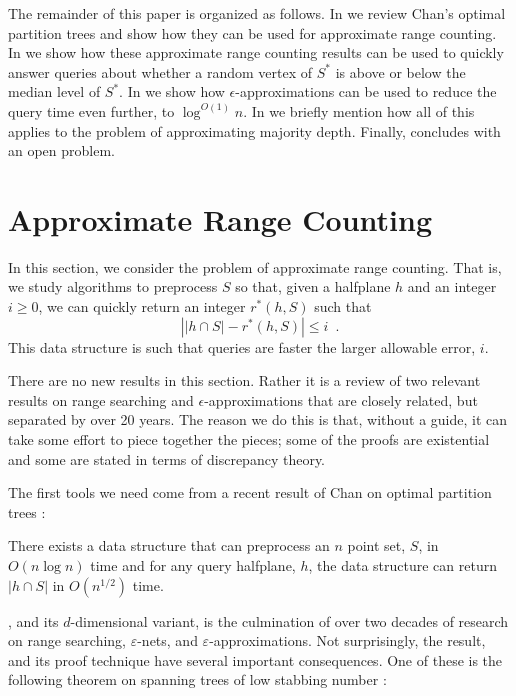 \documentclass{patmorin}
\newcommand{\eps}{\varepsilon}
\begin{document}
The remainder of this paper is organized as follows.  In
 we review Chan's optimal partition trees
and show how they can be used for approximate range counting.
In  we show how these approximate range
counting results can be used to quickly answer queries about whether
a random vertex of $S^*$ is above or below the median level of $S^*$.
In  we show how $\epsilon$-approximations can
be used to reduce the query time even further, to $\log^{O(1)} n$.
In  we briefly mention how all of this applies to
the problem of approximating majority depth.  Finally, 
concludes with an open problem.

\section{Approximate Range Counting}

In this section, we consider the problem of approximate range counting.
That is, we study algorithms to preprocess $S$ so that, given a halfplane
$h$ and an integer $i\ge 0$, we can quickly return an integer $r^*(h,S)$
such that
\[
   \left| |h\cap S| - r^*(h,S)\right| \le i \enspace .
\]
This data structure is such that queries are faster the larger allowable
error, $i$.

There are no new results in this section. Rather it is a review of two
relevant results on range searching and $\epsilon$-approximations that are
closely related, but separated by over 20 years.  The reason we do this
is that, without a guide, it can take some effort to piece together the
pieces; some of the proofs are existential and some are
stated in terms of discrepancy theory.

The first tools we need come from a recent result of Chan on optimal
partition trees \cite[Theorem A.B]{c12}:

\begin{thm}
  There exists a data structure that can preprocess an $n$ point set,
  $S$, in $O(n\log n)$ time and for any query halfplane, $h$, the data
  structure can return $|h\cap S|$ in $O(n^{1/2})$ time.
\end{thm}

, and its $d$-dimensional variant,
is the culmination of over two decades of research on range searching,
$\eps$-nets, and $\eps$-approximations.  Not surprisingly, the result,
and its proof technique have several important consequences.  One of
these is the following theorem on spanning trees of low stabbing number
\cite[Theorem X.Y]{c12}:
\end{document}
